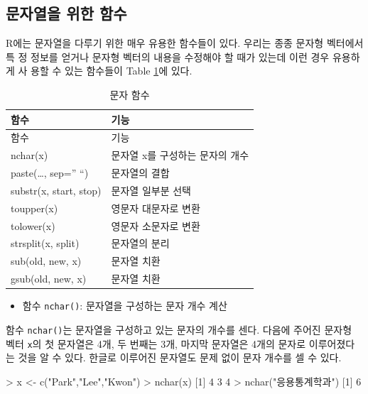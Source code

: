\documentclass[
]{book}
\newenvironment{Shaded}{\begin{snugshade}}{\end{snugshade}}
\newcommand{\DecValTok}[1]{\textcolor[rgb]{0.00,0.00,0.81}{#1}}
\newcommand{\FunctionTok}[1]{\textcolor[rgb]{0.00,0.00,0.00}{#1}}
\newcommand{\NormalTok}[1]{#1}
\newcommand{\OtherTok}[1]{\textcolor[rgb]{0.56,0.35,0.01}{#1}}
\newcommand{\SpecialCharTok}[1]{\textcolor[rgb]{0.00,0.00,0.00}{#1}}
\newcommand{\StringTok}[1]{\textcolor[rgb]{0.31,0.60,0.02}{#1}}
\providecommand{\tightlist}{%
  \setlength{\itemsep}{0pt}\setlength{\parskip}{0pt}}
\begin{document}
\hypertarget{uxbb38uxc790uxc5f4uxc744-uxc704uxd55c-uxd568uxc218}{%
\subsection{문자열을 위한 함수}\label{uxbb38uxc790uxc5f4uxc744-uxc704uxd55c-uxd568uxc218}}

R에는 문자열을 다루기 위한 매우 유용한 함수들이 있다. 우리는 종종 문자형 벡터에서 특
정 정보를 얻거나 문자형 벡터의 내용을 수정해야 할 때가 있는데 이런 경우 유용하게 사
용할 수 있는 함수들이 Table \ref{tab:char-func}에 있다.

\begin{longtable}[]{@{}ll@{}}
\caption{\label{tab:char-func}문자 함수}\tabularnewline
\toprule
함수 & 기능 \\
\midrule
\endfirsthead
\toprule
함수 & 기능 \\
\midrule
\endhead
nchar(x) & 문자열 x를 구성하는 문자의 개수 \\
paste(\ldots, sep='' ``) & 문자열의 결합 \\
substr(x, start, stop) & 문자열 일부분 선택 \\
toupper(x) & 영문자 대문자로 변환 \\
tolower(x) & 영문자 소문자로 변환 \\
strsplit(x, split) & 문자열의 분리 \\
sub(old, new, x) & 문자열 치환 \\
gsub(old, new, x) & 문자열 치환 \\
\bottomrule
\end{longtable}

\begin{itemize}
\tightlist
\item
  함수 \texttt{nchar()}: 문자열을 구성하는 문자 개수 계산
\end{itemize}

함수 \texttt{nchar()}는 문자열을 구성하고 있는 문자의 개수를 센다. 다음에 주어진 문자형 벡터
\texttt{x}의 첫 문자열은 4개, 두 번째는 3개, 마지막 문자열은 4개의 문자로 이루어졌다는 것을
알 수 있다. 한글로 이루어진 문자열도 문제 없이 문자 개수를 셀 수 있다.

\begin{Shaded}
\begin{Highlighting}[]
\SpecialCharTok{\textgreater{}}\NormalTok{ x }\OtherTok{\textless{}{-}} \FunctionTok{c}\NormalTok{(}\StringTok{"Park"}\NormalTok{,}\StringTok{"Lee"}\NormalTok{,}\StringTok{"Kwon"}\NormalTok{)}
\SpecialCharTok{\textgreater{}} \FunctionTok{nchar}\NormalTok{(x)}
\NormalTok{[}\DecValTok{1}\NormalTok{] }\DecValTok{4} \DecValTok{3} \DecValTok{4}
\SpecialCharTok{\textgreater{}} \FunctionTok{nchar}\NormalTok{(}\StringTok{"응용통계학과"}\NormalTok{)}
\NormalTok{[}\DecValTok{1}\NormalTok{] }\DecValTok{6}
\end{Highlighting}
\end{Shaded}
\end{document}
